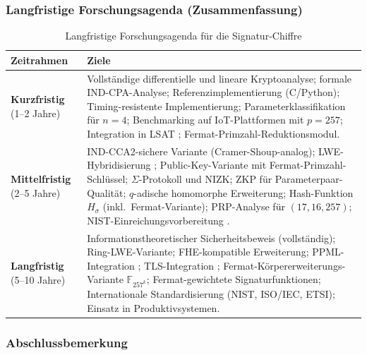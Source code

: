 ﻿\documentclass[a4paper,12pt]{scrreprt}
\theoremstyle{definition}
\begin{document}
\subsubsection{Langfristige Forschungsagenda (Zusammenfassung)}

\begin{table}[ht]
\centering
\caption{Langfristige Forschungsagenda für die Signatur-Chiffre}
\begin{tabular}{@{}p{3.5cm}p{8.5cm}@{}}
\toprule
\textbf{Zeitrahmen} & \textbf{Ziele} \\
\midrule
\textbf{Kurzfristig} (1--2 Jahre) &
Vollständige differentielle und lineare Kryptoanalyse;
formale IND-CPA-Analyse;
Referenzimplementierung (C/Python);
Timing-resistente Implementierung;
Parameterklassifikation für $n = 4$;
Benchmarking auf IoT-Plattformen mit $p = 257$;
Integration in LSAT \cite{Epp26d};
Fermat-Primzahl-Reduktionsmodul.
\\[0.5ex]
\textbf{Mittelfristig} (2--5 Jahre) &
IND-CCA2-sichere Variante (Cramer-Shoup-analog);
LWE-Hybridisierung \cite{Reg05};
Public-Key-Variante mit Fermat-Primzahl-Schlüssel;
$\Sigma$-Protokoll und NIZK;
ZKP für Parameterpaar-Qualität;
$q$-adische homomorphe Erweiterung;
Hash-Funktion $H_\sigma$ (inkl.\ Fermat-Variante);
PRP-Analyse für $(17, 16, 257)$;
NIST-Einreichungsvorbereitung \cite{NIST22}.
\\[0.5ex]
\textbf{Langfristig} (5--10 Jahre) &
Informationstheoretischer Sicherheitsbeweis (vollständig);
Ring-LWE-Variante;
FHE-kompatible Erweiterung;
PPML-Integration \cite{GLP+21};
TLS-Integration \cite{Res18};
Fermat-Körpererweiterungs-Variante $\mathbb{F}_{257^k}$;
Fermat-gewichtete Signaturfunktionen;
Internationale Standardisierung (NIST, ISO/IEC, ETSI);
Einsatz in Produktivsystemen.
\\
\bottomrule
\end{tabular}
\end{table}

\subsubsection{Abschlussbemerkung}
\end{document}
